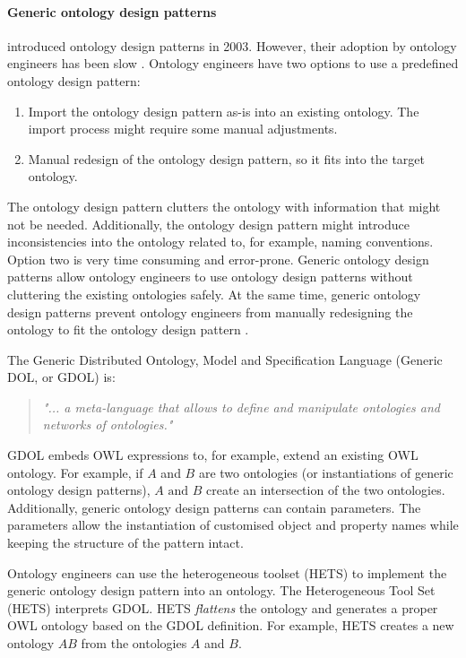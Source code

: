 \paragraph{Generic ontology design patterns} \label{GODP}
\cite{ODP06} introduced ontology design patterns in 2003. However, their adoption by ontology engineers has been slow \parencite{ODP02}. Ontology engineers have two options to use a predefined ontology design pattern:
\begin{enumerate}
\item Import the ontology design pattern as-is into an existing ontology. The import process might require some manual adjustments.
\item Manual redesign of the ontology design pattern, so it fits into the target ontology.
\end{enumerate}

The ontology design pattern clutters the ontology with information that might not be needed. Additionally, the ontology design pattern might introduce inconsistencies into the ontology related to, for example, naming conventions. Option two is very time consuming and error-prone. Generic ontology design patterns allow ontology engineers to use ontology design patterns without cluttering the existing ontologies safely. At the same time, generic ontology design patterns prevent ontology engineers from manually redesigning the ontology to fit the ontology design pattern \parencite{ODP02}. 

The Generic Distributed Ontology, Model and Specification Language (Generic DOL, or GDOL) is:
\begin{quote}\itshape
"... a meta-language that allows to define and manipulate ontologies and networks of ontologies." \parencite{ODP02}
\end{quote}

GDOL embeds OWL expressions to, for example, extend an existing OWL ontology. For example, if $A$ and $B$ are two ontologies (or instantiations of generic ontology design patterns), $A \text{ and } B$ create an intersection of the two ontologies. Additionally, generic ontology design patterns can contain parameters. The parameters allow the instantiation of customised object and property names while keeping the structure of the pattern intact. 

Ontology engineers can use the heterogeneous toolset (HETS) to implement the generic ontology design pattern into an ontology. The Heterogeneous Tool Set (HETS) interprets GDOL. HETS \emph{flattens} the ontology and generates a proper OWL ontology based on the GDOL definition. For example, HETS creates a new ontology $AB$ from the ontologies $A$ and $B$.

